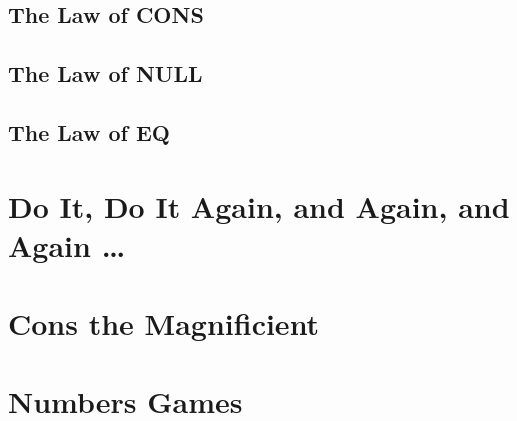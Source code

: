 \documentclass[11pt]{article}
\begin{document}
\subsection{The Law of CONS}
\label{sec:org6dc81f2}
\subsection{The Law of NULL}
\label{sec:orgca24ca9}
\subsection{The Law of EQ}
\label{sec:orgdd1bf09}

























































\section{Do It, Do It Again, and Again, and Again \ldots{}}
\label{sec:org78840a6}

\section{Cons the Magnificient}
\label{sec:org5ef6c09}

\section{Numbers Games}
\label{sec:org71c66d3}
\end{document}

